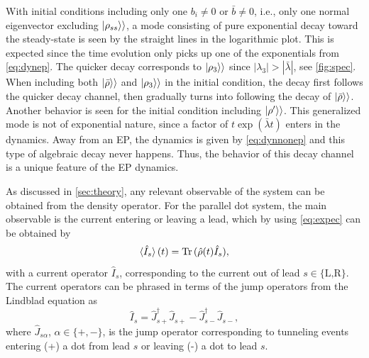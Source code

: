 \documentclass[../main.tex]{subfiles}
\begin{document}
\begin{figure}[H]
\label{fig:diffrho}
\end{figure}

With initial conditions including only one $b_i\neq0$ or $\bar b\neq0$, i.e., only one normal eigenvector excluding $\ket{\rho_{ss}}\rangle$, a mode consisting of pure exponential decay toward the steady-state is seen by the straight lines in the logarithmic plot. This is expected since the time evolution only picks up one of the exponentials from \cref{eq:dynep}. The quicker decay corresponds to $\ket{\rho_3}\rangle$ since $|\lambda_3| > |\bar\lambda|$, see \cref{fig:spec}. When including both $\ket{\bar \rho}\rangle$ and $\ket{\rho_3}\rangle$ in the initial condition, the decay first follows the quicker decay channel, then gradually turns into following the decay of $\ket{\bar\rho}\rangle$. Another behavior is seen for the initial condition including $\ket{\rho'}\rangle$. This generalized mode is not of exponential nature, since a factor of $t\exp(\bar\lambda t)$ enters in the dynamics. Away from an EP, the dynamics is given by \cref{eq:dynnonep} and this type of algebraic decay never happens. Thus, the behavior of this decay channel is a unique feature of the EP dynamics.

As discussed in \cref{sec:theory}, any relevant observable of the system can be obtained from the density operator. For the parallel dot system, the main observable is the current entering or leaving a lead, which by using \cref{eq:expec} can be obtained by
\begin{equation}\label{eq:current}
    \braket{\hat I_s}(t) = \operatorname{Tr}{(\hat \rho(t)\hat I_s)},
\end{equation}
with a current operator $\hat I_s$, corresponding to the current out of lead $s\in\{\text{L,R}\}$. The current operators can be phrased in terms of the jump operators from the Lindblad equation as 
\begin{equation}\label{eq:currjump}
    \hat I_s = \hat J_{s+}^\dag \hat J_{s+} - \hat J_{s-}^\dag \hat J_{s-},
\end{equation}
where $\hat J_{s\alpha}$, $\alpha\in\{+,-\}$, is the jump operator corresponding to tunneling events entering (+) a dot from lead $s$ or leaving (-) a dot to lead $s$.
\end{document}
